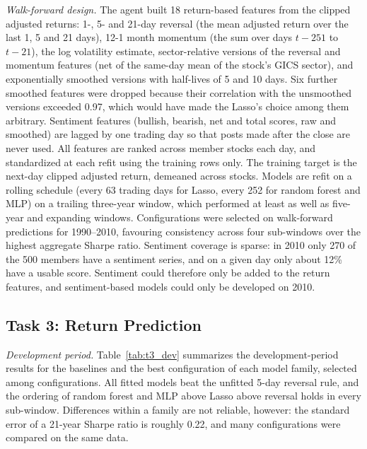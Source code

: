\textit{Walk-forward design.} The agent built 18 return-based features from the clipped adjusted returns: 1-, 5- and 21-day reversal (the mean adjusted return over the last 1, 5 and 21 days), 12-1 month momentum (the sum over days $t-251$ to $t-21$), the log volatility estimate, sector-relative versions of the reversal and momentum features (net of the same-day mean of the stock's GICS sector), and exponentially smoothed versions with half-lives of 5 and 10 days. Six further smoothed features were dropped because their correlation with the unsmoothed versions exceeded 0.97, which would have made the Lasso's choice among them arbitrary. Sentiment features (bullish, bearish, net and total scores, raw and smoothed) are lagged by one trading day so that posts made after the close are never used. All features are ranked across member stocks each day, and standardized at each refit using the training rows only. The training target is the next-day clipped adjusted return, demeaned across stocks. Models are refit on a rolling schedule (every 63 trading days for Lasso, every 252 for random forest and MLP) on a trailing three-year window, which performed at least as well as five-year and expanding windows. Configurations were selected on walk-forward predictions for 1990--2010, favouring consistency across four sub-windows over the highest aggregate Sharpe ratio. Sentiment coverage is sparse: in 2010 only 270 of the 500 members have a sentiment series, and on a given day only about 12\% have a usable score. Sentiment could therefore only be added to the return features, and sentiment-based models could only be developed on 2010.


\subsection{Task 3: Return Prediction}
\label{sec:t3_results}

\textit{Development period.} Table~\ref{tab:t3_dev} summarizes the development-period results for the baselines and the best configuration of each model family, selected among  configurations. All fitted models beat the unfitted 5-day reversal rule, and the ordering of random forest and MLP above Lasso above reversal holds in every sub-window. Differences within a family are not reliable, however: the standard error of a 21-year Sharpe ratio is roughly 0.22, and many configurations were compared on the same data.


